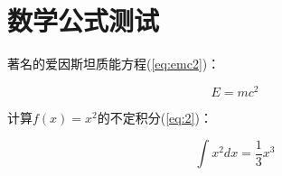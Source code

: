 \section{数学公式测试}

著名的爱因斯坦质能方程(\ref{eq:emc2})：

\begin{equation}
  \label{eq:emc2}
  E=mc^2
\end{equation}

计算$f(x)=x^2$的不定积分(\ref{eq:2})：

\begin{equation}
  \label{eq:2}
  \int x^2 dx = \frac{1}{3} x^3
\end{equation}